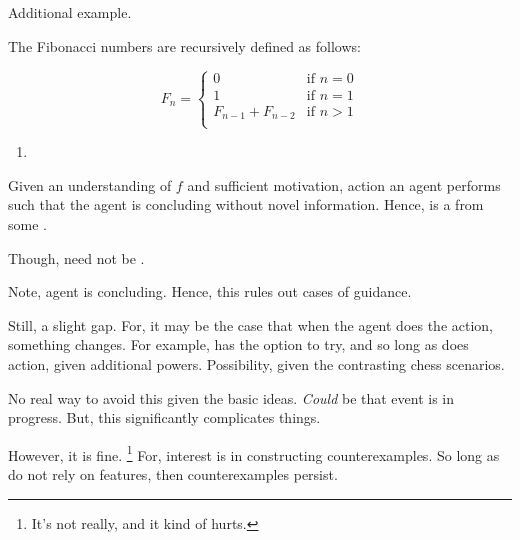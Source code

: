 \begin{note}
  Additional example.

  \begin{scenario}%
    \label{scen:fc:fib}%
    The Fibonacci numbers are recursively defined as follows:

    \[
      F_{n} = \left\{
        \begin{array}{ll}
          0 & \text{if } n = 0 \\
          1 & \text{if } n = 1 \\
          F_{n-1} + F_{n-2} & \text{if } n > 1 \\
        \end{array}
      \right.
    \]
  \end{scenario}

  \begin{enumerate}[label=C\thescenarioCounter., ref=(C\thescenarioCounter)]
  \item
    \label{scen:fc:fib:c}
  \end{enumerate}
  Given an understanding of \(f\) and sufficient motivation, action an agent performs such that the agent is concluding  without novel information.
  Hence,  is a \fc{} from some \pool{}.

  Though,  need not be .
\end{note}


\begin{note}
  Note, agent is concluding.
  Hence, this rules out cases of guidance.

  Still, a slight gap.
  For, it may be the case that when the agent does the action, something changes.
  For example, has the option to try, and so long as does action, given additional powers.
  Possibility, given the contrasting chess scenarios.

  No real way to avoid this given the basic ideas.
  \emph{Could} be that event is in progress.
  But, this significantly complicates things.

  However, it is fine.%
  \footnote{
    It's not really, and it kind of hurts.
  }
  For, interest is in constructing counterexamples.
  So long as do not rely on features, then counterexamples persist.
\end{note}

